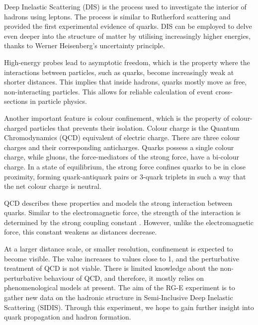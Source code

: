     Deep Inelastic Scattering (DIS) is the process used to investigate the interior of hadrons using leptons.
    The process is similar to Rutherford scattering and provided the first experimental evidence of quarks.
    DIS can be employed to delve even deeper into the structure of matter by utilising increasingly higher energies, thanks to Werner Heisenberg's uncertainty principle.

    High-energy probes lead to asymptotic freedom, which is the property where the interactions between particles, such as quarks, become increasingly weak at shorter distances.
    This implies that inside hadrons, quarks mostly move as free, non-interacting particles.
    This allows for reliable calculation of event cross-sections in particle physics.

    Another important feature is colour confinement, which is the property of colour-charged particles that prevents their isolation.
    Colour charge is the Quantum Chromodynamics (QCD) equivalent of electric charge.
    There are three colour charges and their corresponding anticharges.
    Quarks possess a single colour charge, while gluons, the force-mediators of the strong force, have a bi-colour charge.
    In a state of equilibrium, the strong force confines quarks to be in close proximity, forming quark-antiquark pairs or 3-quark triplets in such a way that the net colour charge is neutral.

    QCD describes these properties and models the strong interaction between quarks.
    Similar to the electromagnetic force, the strength of the interaction is determined by the strong coupling constant \textalpha.
    However, unlike the electromagnetic force, this constant weakens as distances decrease.

    At a larger distance scale, or smaller resolution, confinement is expected to become visible.
    The \textalpha value increases to values close to 1, and the perturbative treatment of QCD is not viable.
    There is limited knowledge about the non-perturbative behaviour of QCD, and therefore, it mostly relies on phenomenological models at present.
    The aim of the RG-E experiment is to gather new data on the hadronic structure in Semi-Inclusive Deep Inelastic Scattering (SIDIS).
    Through this experiment, we hope to gain further insight into quark propagation and hadron formation.

    
    
    

